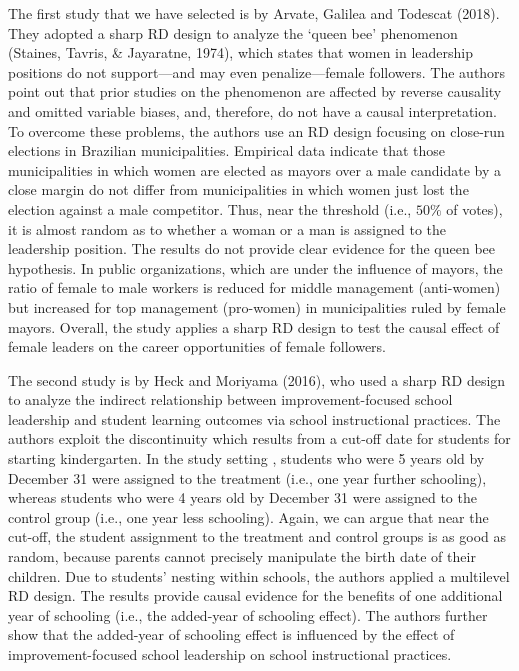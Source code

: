 \documentclass[english]{article}
\begin{document}
The first study that we have selected is by Arvate, Galilea and Todescat
(2018). They adopted a sharp RD design to analyze the `queen bee'
phenomenon (Staines, Tavris, \& Jayaratne, 1974), which states that
women in leadership positions do not support---and may even
penalize---female followers. The authors point out that prior studies on
the phenomenon are affected by reverse causality and omitted variable
biases, and, therefore, do not have a causal interpretation. To overcome
these problems, the authors use an RD design focusing on close-run
elections in Brazilian municipalities. Empirical data indicate that
those municipalities in which women are elected as mayors over a male
candidate by a close margin do not differ from municipalities in which
women just lost the election against a male competitor. Thus, near the
threshold (i.e., \(50\%\) of votes), it is almost random as to whether a
woman or a man is assigned to the leadership position. The results do
not provide clear evidence for the queen bee hypothesis. In public
organizations, which are under the influence of mayors, the ratio of
female to male workers is reduced for middle management (anti-women) but
increased for top management (pro-women) in municipalities ruled by
female mayors. Overall, the study applies a sharp RD design to test the
causal effect of female leaders on the career opportunities of female
followers.

The second study is by Heck and Moriyama (2016), who used a sharp RD
design to analyze the indirect relationship between improvement-focused
school leadership and student learning outcomes via school instructional
practices. The authors exploit the discontinuity which results from a
cut-off date for students for starting kindergarten. In the study
setting , students who were 5 years old by December 31 were assigned to
the treatment (i.e., one year further schooling), whereas students who
were 4 years old by December 31 were assigned to the control group
(i.e., one year less schooling). Again, we can argue that near the
cut-off, the student assignment to the treatment and control groups is
as good as random, because parents cannot precisely manipulate the birth
date of their children. Due to students' nesting within schools, the
authors applied a multilevel RD design. The results provide causal
evidence for the benefits of one additional year of schooling (i.e., the
added-year of schooling effect). The authors further show that the
added-year of schooling effect is influenced by the effect of
improvement-focused school leadership on school instructional practices.
\end{document}
